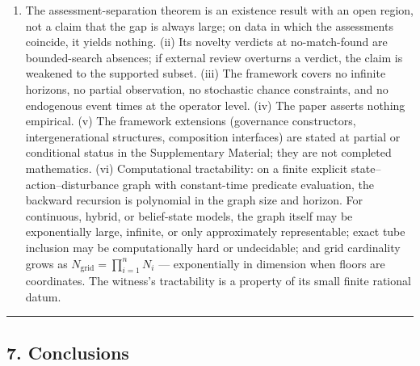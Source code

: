 \documentclass[11pt]{article}
\providecommand{\tightlist}{\setlength{\itemsep}{0pt}\setlength{\parskip}{0pt}}
\begin{document}
\begin{enumerate}
\def\labelenumi{(\roman{enumi})}
\tightlist
\item
  The assessment-separation theorem is an existence result with an open
  region, not a claim that the gap is always large; on data in which the
  assessments coincide, it yields nothing. (ii) Its novelty verdicts at
  no-match-found are bounded-search absences; if external review
  overturns a verdict, the claim is weakened to the supported subset.
  (iii) The framework covers no infinite horizons, no partial
  observation, no stochastic chance constraints, and no endogenous event
  times at the operator level. (iv) The paper asserts nothing empirical.
  (v) The framework extensions (governance constructors,
  intergenerational structures, composition interfaces) are stated at
  partial or conditional status in the Supplementary Material; they are
  not completed mathematics. (vi) Computational tractability: on a
  finite explicit state--action--disturbance graph with constant-time
  predicate evaluation, the backward recursion is polynomial in the
  graph size and horizon. For continuous, hybrid, or belief-state
  models, the graph itself may be exponentially large, infinite, or only
  approximately representable; exact tube inclusion may be
  computationally hard or undecidable; and grid cardinality grows as
  \(N_{\mathrm{grid}} = \prod_{i=1}^n N_i\) --- exponentially in
  dimension when floors are coordinates. The witness's tractability is a
  property of its small finite rational datum.
\end{enumerate}

\begin{center}\rule{0.5\linewidth}{0.5pt}\end{center}

\subsection{7. Conclusions}\label{conclusions}
\end{document}
